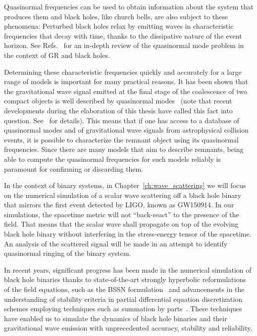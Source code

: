 Quasinormal frequencies can be used to obtain information about the system that produces them and black holes, like church bells, are also subject to these phenomena: Perturbed black holes relax by emitting waves in characteristic frequencies that decay with time, thanks to the dissipative nature of the event horizon. See Refs.~\cite{review1, review2, review3, review4} for an in-depth review of the quasinormal mode problem in the context of \ac{GR} and black holes.

Determining these characteristic frequencies quickly and accurately for a large range of models is important for many practical reasons. It has been shown that the gravitational wave signal emitted at the final stage of the coalescence of two compact objects is well described by quasinormal modes~\cite{buonanno,seidel} (note that recent developments during the elaboration of this thesis have called this fact into question. See~\cite{PhysRevLett.130.081401} for details). This means that if one has access to a database of quasinormal modes and of gravitational wave signals from astrophysical collision events, it is possible to characterize the remnant object using its quasinormal frequencies. Since there are many models that aim to describe remnants, being able to compute the quasinormal frequencies for such models reliably is paramount for confirming or discarding them.

In the context of binary systems, in Chapter~\ref{ch:wave_scattering} we will focus on the numerical simulation of a scalar wave scattering off a black hole binary that mirrors the first event detected by LIGO, known as GW150914. In our simulations, the spacetime metric will not ``back-react'' to the presence of the field. That means that the scalar wave shall propagate on top of the evolving black hole binary without interfering in the stress-energy tensor of the spacetime. An analysis of the scattered signal will be made in an attempt to identify quasinormal ringing of the binary system.

In recent years, significant progress has been made in the numerical simulation of black hole binaries thanks to state-of-the-art strongly hyperbolic reformulations of the field equations, such as the \ac{BSSN} formulation~\cite{PhysRevD.52.5428,PhysRevD.59.024007} and advancements in the understanding of stability criteria in partial differential equation discretization schemes employing techniques such as summation by parts~\cite{Diener2007}. These techniques have enabled us to simulate the dynamics of black hole binaries and their gravitational wave emission with unprecedented accuracy, stability and reliability.

